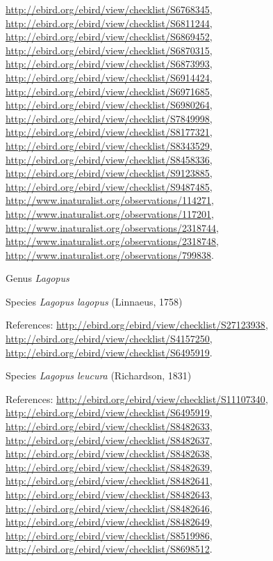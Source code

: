 \documentclass[9pt, article]{memoir}
\begin{document}
\begin{multicols}{2}
\url{http://ebird.org/ebird/view/checklist/S6768345}, 
\url{http://ebird.org/ebird/view/checklist/S6811244}, 
\url{http://ebird.org/ebird/view/checklist/S6869452}, 
\url{http://ebird.org/ebird/view/checklist/S6870315}, 
\url{http://ebird.org/ebird/view/checklist/S6873993}, 
\url{http://ebird.org/ebird/view/checklist/S6914424}, 
\url{http://ebird.org/ebird/view/checklist/S6971685}, 
\url{http://ebird.org/ebird/view/checklist/S6980264}, 
\url{http://ebird.org/ebird/view/checklist/S7849998}, 
\url{http://ebird.org/ebird/view/checklist/S8177321}, 
\url{http://ebird.org/ebird/view/checklist/S8343529}, 
\url{http://ebird.org/ebird/view/checklist/S8458336}, 
\url{http://ebird.org/ebird/view/checklist/S9123885}, 
\url{http://ebird.org/ebird/view/checklist/S9487485}, 
\url{http://www.inaturalist.org/observations/114271}, 
\url{http://www.inaturalist.org/observations/117201}, 
\url{http://www.inaturalist.org/observations/2318744}, 
\url{http://www.inaturalist.org/observations/2318748}, 
\url{http://www.inaturalist.org/observations/799838}.

\vspace{6pt}\noindent\hspace{30pt}Genus \textit{Lagopus}


\vspace{6pt}\noindent\hspace{36pt}Species \textit{Lagopus lagopus} (Linnaeus, 1758)


\vspace{6pt}References: 
\url{http://ebird.org/ebird/view/checklist/S27123938}, 
\url{http://ebird.org/ebird/view/checklist/S4157250}, 
\url{http://ebird.org/ebird/view/checklist/S6495919}.

\vspace{6pt}\noindent\hspace{36pt}Species \textit{Lagopus leucura} (Richardson, 1831)


\vspace{6pt}References: 
\url{http://ebird.org/ebird/view/checklist/S11107340}, 
\url{http://ebird.org/ebird/view/checklist/S6495919}, 
\url{http://ebird.org/ebird/view/checklist/S8482633}, 
\url{http://ebird.org/ebird/view/checklist/S8482637}, 
\url{http://ebird.org/ebird/view/checklist/S8482638}, 
\url{http://ebird.org/ebird/view/checklist/S8482639}, 
\url{http://ebird.org/ebird/view/checklist/S8482641}, 
\url{http://ebird.org/ebird/view/checklist/S8482643}, 
\url{http://ebird.org/ebird/view/checklist/S8482646}, 
\url{http://ebird.org/ebird/view/checklist/S8482649}, 
\url{http://ebird.org/ebird/view/checklist/S8519986}, 
\url{http://ebird.org/ebird/view/checklist/S8698512}.


\end{multicols}
\end{document}
